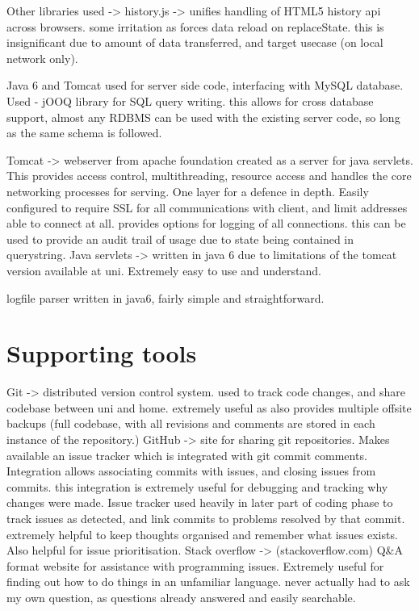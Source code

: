 Other libraries used -> 
history.js -> unifies handling of HTML5 history api across browsers. some irritation as forces data reload on replaceState. this is insignificant due to amount of data transferred, and target usecase (on local network only).

Java 6 and Tomcat used for server side code, interfacing with MySQL database.
Used - jOOQ library for SQL query writing. this allows for cross database support, almost any RDBMS can be used with the existing server code, so long as the same schema is followed.

Tomcat -> webserver from apache foundation created as a server for java servlets. This provides access control, multithreading, resource access and handles the core networking processes for serving. One layer for a defence in depth. Easily configured to require SSL for all communications with client, and limit addresses able to connect at all.
provides options for logging of all connections. this can be used to provide an audit trail of usage due to state being contained in querystring.
Java servlets -> written in java 6 due to limitations of the tomcat version available at uni. Extremely easy to use and understand.

logfile parser written in java6, fairly simple and straightforward.

\section{Supporting tools}
Git -> distributed version control system. used to track code changes, and share codebase between uni and home. extremely useful as also provides multiple offsite backups (full codebase, with all revisions and comments are stored in each instance of the repository.)
GitHub -> site for sharing git repositories. Makes available an issue tracker which is integrated with git commit comments. Integration allows associating commits with issues, and closing issues from commits. this integration is extremely useful for debugging and tracking why changes were made. Issue tracker used heavily in later part of coding phase to track issues as detected, and link commits to problems resolved by that commit.
extremely helpful to keep thoughts organised and remember what issues exists. Also helpful for issue prioritisation.
Stack overflow -> (stackoverflow.com) Q\&A format website for assistance with programming issues. Extremely useful for finding out how to do things in an unfamiliar language. never actually had to ask my own question, as questions already answered and easily searchable.